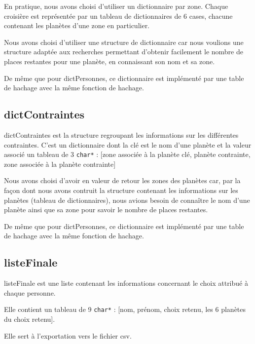 \documentclass[a4paper, 11pt]{article}
\begin{document}
En pratique, nous avons choisi d'utiliser un dictionnaire par zone. Chaque croisière est représentée par un tableau de dictionnaires de 6 cases, chacune contenant les planètes d'une zone en particulier.

Nous avons choisi d'utiliser une structure de dictionnaire car nous voulions une structure adaptée aux recherches permettant d'obtenir facilement le nombre de places restantes pour une planète, en connaissant son nom et sa zone.

De même que pour dictPersonnes, ce dictionnaire est implémenté par une table de hachage avec la même fonction de hachage.

\subsection{dictContraintes}
dictContraintes est la structure regroupant les informations sur les différentes contraintes. C'est un dictionnaire dont la clé est le nom d'une planète et la valeur associé un tableau de 3 \texttt{char*} : [zone associée à la planète clé, planète contrainte, zone associée à la planète contrainte]

Nous avons choisi d'avoir en valeur de retour les zones des planètes car, par la façon dont nous avons contruit la structure contenant les informations sur les planètes (tableau de dictionnaires), nous avions besoin de conna\^itre le nom d'une planète ainsi que sa zone pour savoir le nombre de places restantes.

De même que pour dictPersonnes, ce dictionnaire est implémenté par une table de hachage avec la même fonction de hachage.

\subsection{listeFinale}
listeFinale est une liste contenant les informations concernant le choix attribué à chaque personne. 

Elle contient un tableau de 9 \texttt{char*} : [nom, prénom, choix retenu, les 6 planètes du choix retenu].

Elle sert à l'exportation vers le fichier csv. 
\end{document}

